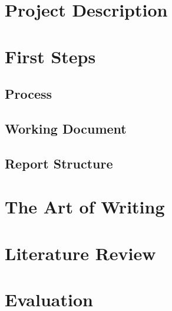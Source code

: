 \documentclass[a4paper]{memoir}
\begin{document}
\chapter{Project Description}
\label{sec:projectdesc}

\chapter{First Steps}

\section{Process}

\section{Working Document}

\section{Report Structure}

\chapter{The Art of Writing}

\chapter{Literature Review}

\chapter{Evaluation}
\end{document}
